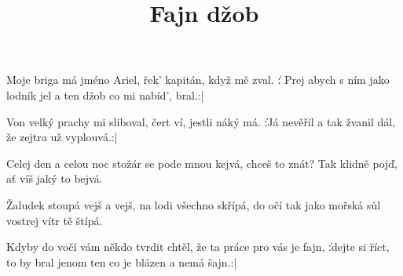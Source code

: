 \beginsong

\title{Fajn džob}

\beginverse
Moje briga má jméno Ariel,
řek' kapitán, když mě zval.
\|: Prej abych s ním jako lodník jel
a ten džob co mi nabíd', bral.:|{}
\endverse

\beginverse
Von velký prachy mi sliboval,
čert ví, jestli náký má.
\|:Já nevěřil a tak žvanil dál,
že zejtra už vyplouvá.:|{}
\endverse

\beginverse
Celej den a celou noc
stožár se pode mnou kejvá,
chceš to znát? Tak klidně pojď,
ať víš jaký to bejvá.

Žaludek stoupá vejš a vejš,
na lodi všechno skřípá,
do očí tak jako mořská sůl
vostrej vítr tě štípá.
\endverse

\beginverse
Kdyby do vočí vám někdo tvrdit chtěl,
že ta práce pro vás je fajn,
\|:dejte si říct, to by bral jenom ten
co je blázen a nemá šajn.:|{}
\endverse



